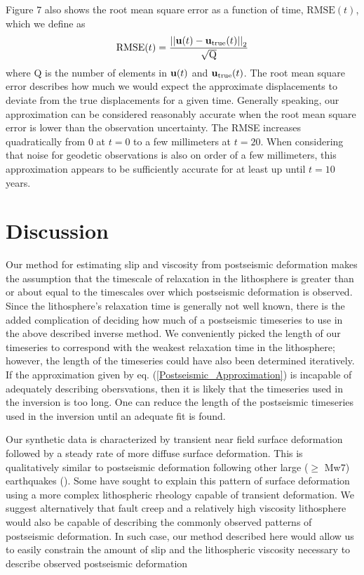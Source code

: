 \documentclass[12pt]{article}
\begin{document}
Figure 7 also shows the root mean square error as
a function of time, $\mathrm{RMSE}(t)$, which we define as
\begin{equation}
  \mathrm{RMSE}(t) = \frac{\left|\left|\bold{u}(t) -
    \bold{u}_{\mathrm{true}}(t)\right|\right|_2}{\sqrt{\mathrm{Q}}}
\end{equation}
where Q is the number of elements in $\bold{u}(t)$ and
$\bold{u}_{\mathrm{true}}(t)$.  The root mean square error describes
how much we would expect the approximate displacements to deviate from
the true displacements for a given time.  Generally speaking, our
approximation can be considered reasonably accurate when the root mean square error
is lower than the observation uncertainty.  The RMSE increases
quadratically from 0 at $t=0$ to a few millimeters at $t=20$.  When
considering that noise for geodetic observations is also on order of a
few millimeters, this approximation appears to be sufficiently
accurate for at least up until $t=10$ years.


\section{Discussion}

Our method for estimating slip and viscosity from postseismic
deformation makes the assumption that the timescale of relaxation in
the lithosphere is greater than or about equal to the timescales over
which postseismic deformation is observed.  Since the lithosphere's
relaxation time is generally not well known, there is the added
complication of deciding how much of a postseismic timeseries to use
in the above described inverse method.  We conveniently picked the
length of our timeseries to correspond with the weakest relaxation
time in the lithosphere; however, the length of the timeseries could
have also been determined iteratively.  If the approximation given by
eq. (\ref{Postseismic_Approximation}) is incapable of adequately
describing obersvations, then it is likely that the timeseries used in
the inversion is too long.  One can reduce the length of the
postseismic timeseries used in the inversion until an adequate fit is
found.

Our synthetic data is characterized by transient near field surface
deformation followed by a steady rate of more diffuse surface
deformation.  This is qualitatively similar to postseismic
deformation following other large ($\geq$ Mw7) earthquakes
(\citep{P2003,P2005,R2007,R2015}).  Some have sought to explain this
pattern of surface deformation using a more complex lithospheric
rheology capable of transient deformation. We suggest
alternatively that fault creep and a relatively high viscosity
lithosphere would also be capable of describing the commonly observed
patterns of postseismic deformation.  In such case, our method
described here would allow us to easily constrain the amount of slip
and the lithospheric viscosity necessary to describe observed
postseismic deformation
\end{document}
